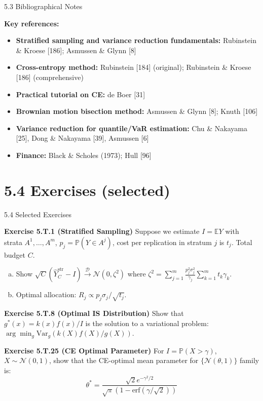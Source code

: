 \documentclass[aspectratio=169,10pt]{beamer}
\begin{document}
\begin{frame}{5.3 Bibliographical Notes}

  \textbf{Key references:}
  \begin{itemize}
    \item \textbf{Stratified sampling and variance reduction fundamentals:}
          Rubinstein \& Kroese [186]; Asmussen \& Glynn [8]
    \item \textbf{Cross-entropy method:}
          Rubinstein [184] (original); Rubinstein \& Kroese [186] (comprehensive)
    \item \textbf{Practical tutorial on CE:} de Boer [31]
    \item \textbf{Brownian motion bisection method:}
          Asmussen \& Glynn [8]; Knuth [106]
    \item \textbf{Variance reduction for quantile/VaR estimation:}
          Chu \& Nakayama [25], Dong \& Nakayama [39], Asmussen [6]
    \item \textbf{Finance:} Black \& Scholes (1973); Hull [96]
  \end{itemize}

\end{frame}

\section{5.4 Exercises (selected)}

\begin{frame}[allowframebreaks]{5.4 Selected Exercises}

  \textbf{Exercise 5.T.1 (Stratified Sampling)}
  Suppose we estimate $I = \mathbb{E}Y$ with strata $A^1, \ldots, A^m$,
  $p_j = \mathbb{P}(Y \in A^j)$, cost per replication in stratum $j$ is $t_j$.
  Total budget $C$.
  \begin{enumerate}[(a)]
    \item Show $\sqrt{C}(\hat{Y}_C^{\mathrm{str}} - I) \xrightarrow{\mathcal{D}} \mathcal{N}(0, \zeta^2)$
          where $\zeta^2 = \sum_{j=1}^m \frac{p_j^2\sigma_j^2}{\gamma_j}\sum_{k=1}^m t_k\gamma_k$.
    \item Optimal allocation: $R_j \propto p_j\sigma_j / \sqrt{t_j}$.
  \end{enumerate}

  \medskip
  \textbf{Exercise 5.T.8 (Optimal IS Distribution)}
  Show that $g^*(x) = k(x)f(x)/I$ is the solution to a variational problem:
  $\arg\min_g \mathrm{Var}_g(k(X)f(X)/g(X))$.

  \medskip
  \textbf{Exercise 5.T.25 (CE Optimal Parameter)}
  For $I = \mathbb{P}(X > \gamma)$, $X \sim \mathcal{N}(0,1)$, show that the
  CE-optimal mean parameter for $\{\mathcal{N}(\theta, 1)\}$ family is:
  \[
    \theta^* = \frac{\sqrt{2}e^{-\gamma^2/2}}{\sqrt{\pi}(1 - \mathrm{erf}(\gamma/\sqrt{2}))}
  \]

\end{frame}
\end{document}
